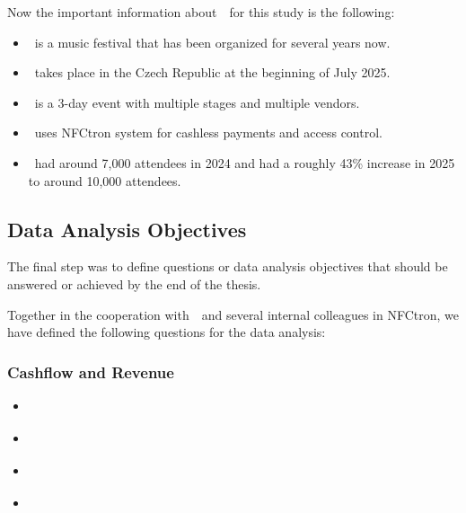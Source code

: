 Now the important information about~\theEvent~for this study is the following:
\begin{itemize}
	\item \theEvent~is a music festival that has been organized for several years now.
	\item \theEvent~takes place in the Czech Republic at the beginning of July 2025.
	\item \theEvent~is a 3-day event with multiple stages and multiple vendors.
	\item \theEvent~uses NFCtron system for cashless payments and access control.
	\item \theEvent~had around 7,000 attendees in 2024 and had a roughly 43\% increase in 2025 to around 10,000 attendees.
\end{itemize}

\subsection*{Data Analysis Objectives}
\label{subsec:introduction-objectives-data-analysis}

The final step was to define questions or data analysis objectives that should be answered or achieved by the end of the thesis.

Together in the cooperation with~\theOrganizer~and several internal colleagues in NFCtron, we have defined the following questions for the data analysis:

\subsubsection*{Cashflow and Revenue}
\begin{itemize}
	\item \textit{}
	\item \textit{}
	\item \textit{}
	\item \textit{}
\end{itemize}

